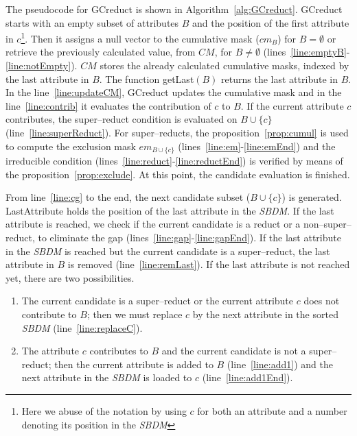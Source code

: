 \documentclass[authoryear,preprint,review,12pt]{elsarticle}
\begin{document}
		The pseudocode for GCreduct is shown in Algorithm~\ref{alg:GCreduct}. GCreduct starts with an empty subset of attributes $B$ and the position of the first attribute in $c$\footnote{Here we abuse of the notation by using $c$ for both an attribute and a number denoting its position in the \textit{SBDM}}. Then it assigns a null vector to the cumulative mask ($cm_B$) for $B=\emptyset$ or retrieve the previously calculated value, from $CM$, for $B\neq \emptyset$ (lines~\ref{line:emptyB}-\ref{line:notEmpty}). $CM$ stores the already calculated cumulative masks, indexed by the last attribute in $B$. The function getLast$(B)$ returns the last attribute in $B$. In the line~\ref{line:updateCM}, GCreduct updates the cumulative mask and in		the line~\ref{line:contrib} it evaluates the contribution of $c$ to $B$. If the current attribute $c$ contributes, the super--reduct condition is evaluated on $B\cup \lbrace c\rbrace$ (line~\ref{line:superReduct}). For super--reducts, the proposition~\ref{prop:cumul} is used to compute the exclusion mask $em_{B\cup \lbrace c\rbrace}$ (lines~\ref{line:em}-\ref{line:emEnd}) and the irreducible condition (lines~\ref{line:reduct}-\ref{line:reductEnd}) is verified by means of the proposition~\ref{prop:exclude}. At this point, the candidate evaluation is finished.
		
		From line~\ref{line:cg} to the end, the next candidate subset ($B\cup \lbrace c\rbrace$) is generated. 
		LastAttribute holds the position of the last attribute in the \textit{SBDM}. If the last attribute is
		reached, we check if the current candidate is a reduct or a non--super--reduct, to eliminate the gap
		(lines~\ref{line:gap}-\ref{line:gapEnd}). If the last attribute in the \textit{SBDM} is reached but the current candidate is a super--reduct, the last attribute in $B$ is removed (line~\ref{line:remLast}). If the last attribute is 
		not reached yet, there are two possibilities. 
		\begin{enumerate}
			\item The current candidate is a super--reduct or the current attribute $c$ does not contribute to $B$; then we must replace $c$ by the next attribute in the sorted \textit{SBDM} (line~\ref{line:replaceC}).
			\item The attribute $c$ contributes to $B$ and the current candidate is not a super--reduct; then the current attribute is added to $B$ (line~\ref{line:add1}) and the next attribute in the \textit{SBDM} is loaded to $c$ (line~\ref{line:add1End}).
		\end{enumerate}  
	
\end{document}
